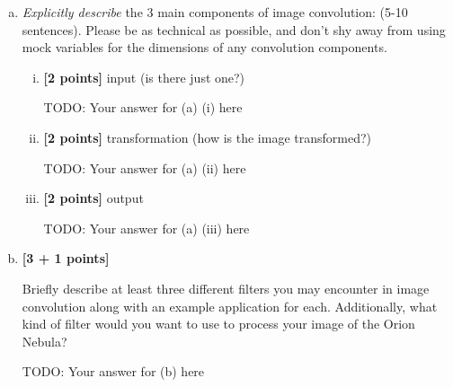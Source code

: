 \begin{enumerate}[(a)]
\item 
\begin{tcolorbox}[colback=orange!5!white,colframe=orange!75!black]
\emph{Explicitly describe} the 3 main components of image convolution: (5-10 sentences). Please be as technical as possible, and don't shy away from using mock variables for the dimensions of any convolution components.
\end{tcolorbox}
\begin{enumerate}[(i)]
    \item \textbf{[2 points]} input (is there just one?) 
    \begin{mdframed}
        TODO: Your answer for (a) (i) here
    \end{mdframed}
    
    \item \textbf{[2 points]} transformation (how is the image transformed?) 

    \begin{mdframed}
        TODO: Your answer for (a) (ii) here
    \end{mdframed}
    
    \item \textbf{[2 points]} output
    
    \begin{mdframed}
        TODO: Your answer for (a) (iii) here
    \end{mdframed}
    
\end{enumerate}


\item \textbf{[3 + 1 points]} 
\begin{tcolorbox}[colback=orange!5!white,colframe=orange!75!black]
Briefly describe at least three different filters you may encounter in image convolution along with an example application for each. Additionally, what kind of filter would you want to use to process your image of the Orion Nebula? 
\end{tcolorbox}

\begin{mdframed}
    TODO: Your answer for (b) here
\end{mdframed}






\end{enumerate}
